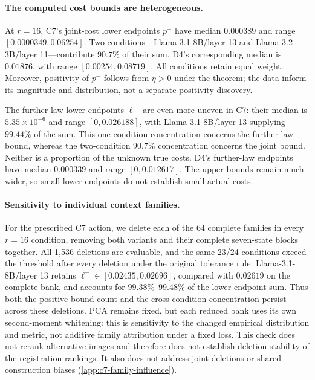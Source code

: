 \paragraph{The computed cost bounds are heterogeneous.}
At $r=16$, C7's joint-cost lower endpoints $p^-$ have median $0.000389$ and range $[0.0000349,0.06254]$. Two conditions---Llama-3.1-8B/layer 13 and Llama-3.2-3B/layer 11---contribute $90.7\%$ of their sum. D4's corresponding median is $0.01876$, with range $[0.00254,0.08719]$. All conditions retain equal weight. Moreover, positivity of $p^-$ follows from $\eta>0$ under the theorem; the data inform its magnitude and distribution, not a separate positivity discovery.

The further-law lower endpoints $\ell^-$ are even more uneven in C7: their median is $5.35\times10^{-6}$ and range $[0,0.026188]$, with Llama-3.1-8B/layer 13 supplying $99.44\%$ of the sum. This one-condition concentration concerns the further-law bound, whereas the two-condition $90.7\%$ concentration concerns the joint bound. Neither is a proportion of the unknown true costs. D4's further-law endpoints have median $0.000339$ and range $[0,0.012617]$. The upper bounds remain much wider, so small lower endpoints do not establish small actual costs.

\paragraph{Sensitivity to individual context families.}
For the prescribed C7 action, we delete each of the 64 complete families in every $r=16$ condition, removing both variants and their complete seven-state blocks together. All 1,536 deletions are evaluable, and the same 23/24 conditions exceed the threshold after every deletion under the original tolerance rule. Llama-3.1-8B/layer 13 retains $\ell^-\in[0.02435,0.02696]$, compared with $0.02619$ on the complete bank, and accounts for $99.38\%$--$99.48\%$ of the lower-endpoint sum. Thus both the positive-bound count and the cross-condition concentration persist across these deletions. PCA remains fixed, but each reduced bank uses its own second-moment whitening: this is sensitivity to the changed empirical distribution and metric, not additive family attribution under a fixed loss. This check does not rerank alternative images and therefore does not establish deletion stability of the registration rankings. It also does not address joint deletions or shared construction biases (\cref{app:c7-family-influence}).

